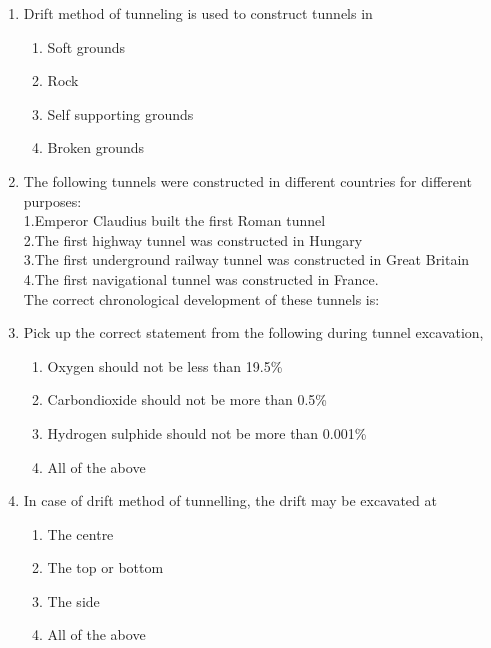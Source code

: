 \documentclass[11pt,a4paper]{article}
\begin{document}
\begin{enumerate}
{Select your answer}
\begin{enumerate}[label=\Alph*.]
\item{Both A and R is true and R is the correct explanation of A}
\item{Both A and R is true and R is not the correct explanation of A}
\item{A is true but R is false}
\item{A is false but R is true}
\end{enumerate}
\item{Drift method of tunneling is used to construct tunnels in}
\begin{enumerate}[label=\Alph*.]
\item{Soft grounds}
\item{Rock}
\item{Self supporting grounds}
\item{Broken grounds}
\end{enumerate}
\item{The following tunnels were constructed in different countries for different purposes:  \\
1.Emperor Claudius built the first Roman tunnel \\
2.The first highway tunnel was constructed in Hungary \\
3.The first underground railway tunnel was constructed in Great Britain \\
4.The first navigational tunnel was constructed in France. \\
The correct chronological development of these tunnels is:}
\\
\item{Pick up the correct statement from the following during tunnel excavation,}
\begin{enumerate}[label=\Alph*.]
\item{Oxygen should not be less than 19.5\%}
\item{Carbondioxide should not be more than 0.5\%}
\item{Hydrogen sulphide should not be more than 0.001\%}
\item{All of the above}
\end{enumerate}
\item{In case of drift method of tunnelling, the drift may be excavated at}
\begin{enumerate}[label=\Alph*.]
\item{The centre}
\item{The top or bottom}
\item{The side}
\item{All of the above}
\end{enumerate}
\end{enumerate}
\end{document}
